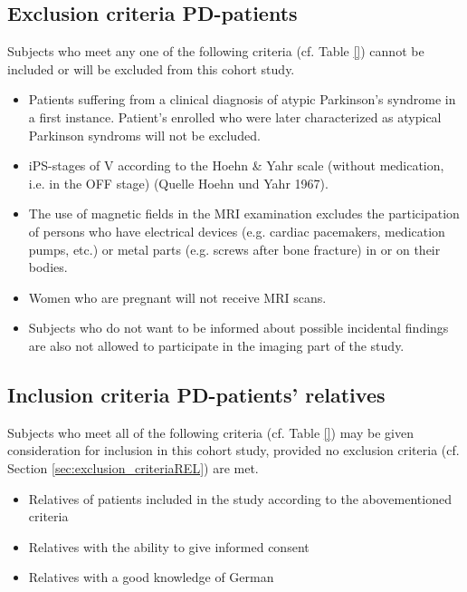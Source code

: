 \subsection{Exclusion criteria \ac{PD}-patients}
\label{sec:exclusion_criteriaIPS}
Subjects who meet any one of the following criteria (cf. Table \ref{}) cannot be included or will be excluded from this cohort study.
\begin{itemize}
\item Patients suffering from a clinical diagnosis of atypic Parkinson's syndrome in a first instance. Patient's enrolled who were later characterized as atypical Parkinson syndroms will not be excluded.
\item \ac{iPS}-stages of V according to the Hoehn \& Yahr scale (without medication, i.e. in the OFF stage) (Quelle Hoehn und Yahr 1967).
\item The use of magnetic fields in the MRI examination excludes the participation of persons who have electrical devices (e.g. cardiac pacemakers, medication pumps, etc.) or metal parts (e.g. screws after bone fracture) in or on their bodies. 
\item Women who are pregnant will not receive \ac{MRI} scans.
\item Subjects who do not want to be informed about possible incidental findings are also not allowed to participate in the imaging part of the study.
\end{itemize}

\subsection{Inclusion criteria \ac{PD}-patients' relatives}
\label{sec:inclusion_criteriaREL}
Subjects who meet all of the following criteria (cf. Table \ref{}) may be given consideration for inclusion in this cohort study, provided no exclusion criteria (cf. Section \ref{sec:exclusion_criteriaREL}) are met.

\begin{itemize}
  \item Relatives of patients included in the study according to the abovementioned criteria 
  \item Relatives with the ability to give informed consent 
  \item Relatives with a good knowledge of German 
\end{itemize}

